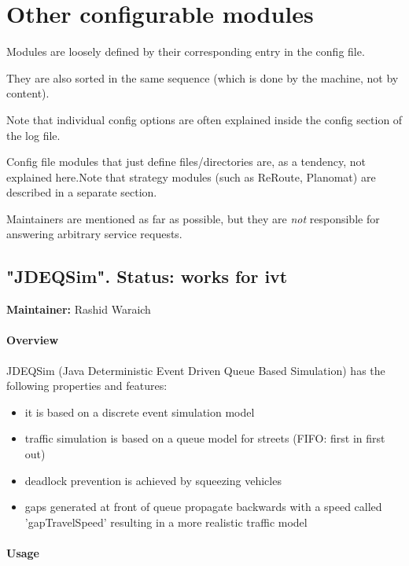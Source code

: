 \chapter{Other configurable modules}

Modules are loosely defined by their corresponding entry in the config file.

They are also sorted in the same sequence (which is done by the machine, not by content).

Note that individual config options are often explained inside the config section of the log file.

Config file modules that just define files/directories are, as a tendency, not explained here.Note that strategy modules (such as ReRoute, Planomat) are described in a separate section.

Maintainers are mentioned as far as possible, but they are \emph{not} responsible for answering arbitrary service requests.

\vfill\eject
\section{"JDEQSim".  Status: works for ivt}

\textbf{Maintainer:} Rashid Waraich

\subsubsection{Overview}

JDEQSim (Java Deterministic Event Driven Queue Based Simulation) has the following properties and features:
\begin{itemize}
	\item it is based on a discrete event simulation model
	\item traffic simulation is based on a queue model for streets (FIFO: first in first out)
	\item deadlock prevention is achieved by squeezing vehicles
	\item gaps  generated at front of queue propagate backwards with a speed called  'gapTravelSpeed' resulting in a more realistic traffic model
\end{itemize}

\subsubsection{Usage}

